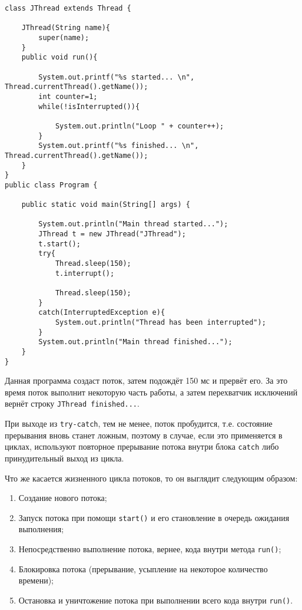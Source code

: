 \begin{lstlisting}
class JThread extends Thread {
      
    JThread(String name){
        super(name);
    }
    public void run(){
          
        System.out.printf("%s started... \n", Thread.currentThread().getName());
        int counter=1;
        while(!isInterrupted()){
             
            System.out.println("Loop " + counter++);
        }
        System.out.printf("%s finished... \n", Thread.currentThread().getName());
    }
}
public class Program {
  
    public static void main(String[] args) {
          
        System.out.println("Main thread started...");
        JThread t = new JThread("JThread");
        t.start();
        try{
            Thread.sleep(150);
            t.interrupt();
              
            Thread.sleep(150);
        }
        catch(InterruptedException e){
            System.out.println("Thread has been interrupted");
        }
        System.out.println("Main thread finished...");
    }
}
\end{lstlisting}

Данная программа создаст поток, затем подождёт 150 мс и прервёт его. За это время поток выполнит некоторую часть работы, а затем перехватчик исключений вернёт строку \verb|JThread finished...|. 

При выходе из \verb|try-catch|, тем не менее, поток пробудится, т.е. состояние прерывания вновь станет ложным, поэтому в случае, если это применяется в циклах, используют повторное прерывание потока внутри блока \verb|catch| либо принудительный выход из цикла.

Что же касается жизненного цикла потоков, то он выглядит следующим образом:

\begin{enumerate}
    \item Создание нового потока;
    \item Запуск потока при помощи \verb|start()| и его становление в очередь ожидания выполнения;
    \item Непосредственно выполнение потока, вернее, кода внутри метода \verb|run()|;
    \item Блокировка потока (прерывание, усыпление на некоторое количество времени);
    \item Остановка и уничтожение потока при выполнении всего кода внутри \verb|run()|.
\end{enumerate}

